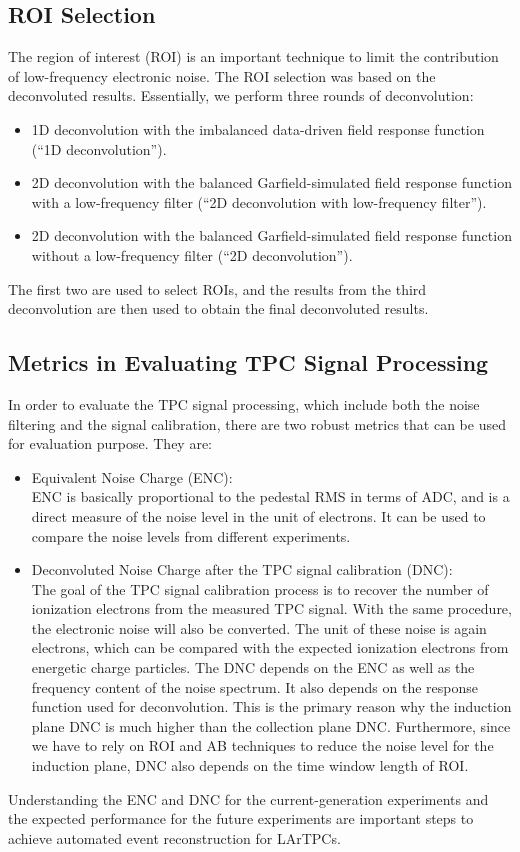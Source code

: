 \subsection{ROI Selection}
The region of interest (ROI) is an important technique to limit the contribution of low-frequency 
electronic noise. The ROI selection was based on the deconvoluted results. Essentially, we perform
three rounds of deconvolution:
\begin{itemize}
\item 1D deconvolution with the imbalanced data-driven field response function (``1D deconvolution'').
\item 2D deconvolution with the balanced Garfield-simulated field response function with a low-frequency filter (``2D deconvolution with low-frequency filter'').
\item 2D deconvolution with the balanced Garfield-simulated field response function without a low-frequency filter (``2D deconvolution'').
\end{itemize}
The first two are used to select ROIs, and the results from the third deconvolution are then used to obtain the final 
deconvoluted results. 

\subsection{Metrics in Evaluating TPC Signal Processing}

In order to evaluate the TPC signal processing, which include both the noise filtering and 
the signal calibration, there are two robust metrics that can be used for evaluation 
purpose. 
They are:
\begin{itemize}
\item Equivalent Noise Charge (ENC): \\
  ENC is  basically proportional to the pedestal RMS in terms of ADC, and is a direct 
measure of the noise level in the unit of electrons. It can be used to compare the 
noise levels from different experiments.
\item Deconvoluted Noise Charge after the TPC signal calibration (DNC): \\
The goal of the TPC signal calibration process is to recover the number of ionization 
electrons from the measured TPC signal. With the same procedure, the electronic noise
will also be converted. The unit of these noise is again electrons, which can be compared with 
the expected ionization electrons from energetic charge particles. 
The DNC depends on the ENC as well as the frequency content of the noise spectrum. It
also depends on the response function used for deconvolution. This is the primary reason 
why the induction plane DNC is much higher than the collection plane DNC. Furthermore, since
we have to rely on ROI and AB techniques to reduce the noise level for the induction plane,
DNC also depends on the time window length of ROI. 
\end{itemize}
Understanding the ENC and DNC for the current-generation experiments and the expected 
performance for the future experiments are important steps to achieve automated event 
reconstruction for LArTPCs.


